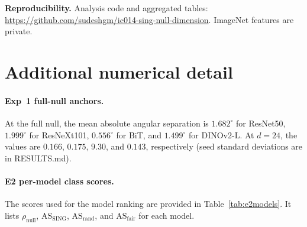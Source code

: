\documentclass[10pt,twocolumn]{article}
\begin{document}
\vspace{0.4em}
\noindent\textbf{Reproducibility.}
Analysis code and aggregated tables: \url{https://github.com/sudeshgm/ic014-sing-null-dimension}.  
ImageNet features are private.

{\small


}

\appendix

\section{Additional numerical detail}
\vspace{-0.2em}
\paragraph{Exp~1 full-null anchors.}
At the full null, the mean absolute angular separation is $1.682^\circ$ for ResNet50, $1.999^\circ$ for ResNeXt101, $0.556^\circ$ for BiT, and $1.499^\circ$ for DINOv2-L. At $d=24$, the values are $0.166$, $0.175$, $9.30$, and $0.143$, respectively (seed standard deviations are in RESULTS.md).

\paragraph{E2 per-model class scores.}
The scores used for the model ranking are provided in Table~\ref{tab:e2models}. It lists $\rho_{\mathrm{null}}$, $\mathrm{AS}_{\mathrm{SING}}$, $\mathrm{AS}_{\mathrm{rand}}$, and $\mathrm{AS}_{\mathrm{fair}}$ for each model.
\end{document}
